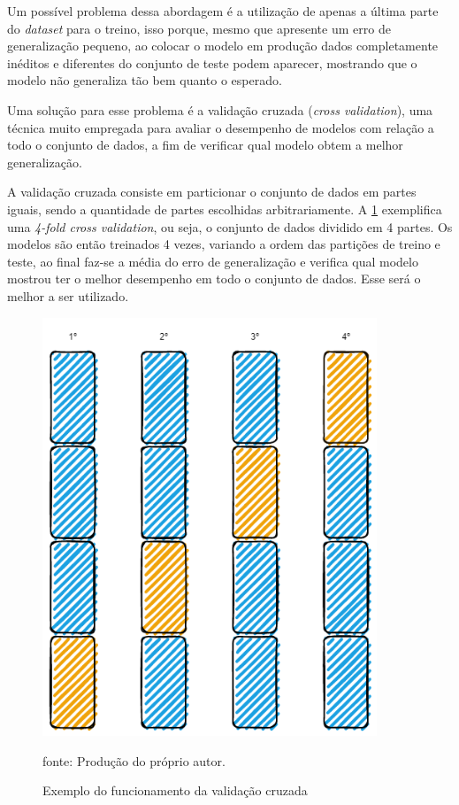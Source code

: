 \documentclass[
  12pt,		%
  a4paper,	%
  openright,%
  oneside,	%
  chapter=TITLE,		%
  section=TITLE,		%
  english,	%
  french,	%
  spanish,	%
  brazil	%
]{abntex2}
\begin{document}
    Um possível problema dessa abordagem é a utilização de apenas a última parte do \textit{dataset} para o treino, isso porque,
    mesmo que apresente um erro de generalização pequeno, ao colocar o modelo em produção dados completamente inéditos e diferentes
    do conjunto de teste podem aparecer, mostrando que o modelo não generaliza tão bem quanto o esperado.

    Uma solução para esse problema é a validação cruzada (\textit{cross validation}), uma técnica muito empregada para avaliar o desempenho de
    modelos com relação a todo o conjunto de dados, a fim de verificar qual modelo obtem a melhor generalização.

    A validação cruzada consiste em particionar o conjunto de dados em partes iguais, sendo a quantidade de partes escolhidas
    arbitrariamente. A \ref*{exemplo_cross_val} exemplifica uma \textit{4-fold cross validation}, ou seja, o conjunto de dados
    dividido em 4 partes. Os modelos são então treinados 4 vezes, variando a ordem das partições de treino e teste, ao final
    faz-se a média do erro de generalização e verifica qual modelo mostrou ter o melhor desempenho em todo o conjunto de dados.
    Esse será o melhor a ser utilizado.

    \begin{figure}[ht]
        \centering
        \caption{Exemplo do funcionamento da validação cruzada}
        \includegraphics[width=10cm]{../reports/figures/cross_validation_example.png}
        \label{exemplo_cross_val}
        \par
        {\small fonte: Produção do próprio autor.}
    \end{figure}
    
\end{document}
